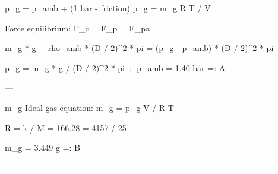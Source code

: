 p_g = p_amb + (1 bar - friction)  
p_g = m_g R T / V  

Force equilibrium:  
F_c = F_p = F_pa  

m_g * g + rho_amb * (D / 2)^2 * pi = (p_g - p_amb) * (D / 2)^2 * pi  

p_g = m_g * g / (D / 2)^2 * pi + p_amb = 1.40 bar =: A  

---

m_g  
Ideal gas equation:  
m_g = p_g V / R T  

R = k / M = 166.28 = 4157 / 25  

m_g = 3.449 g =: B  

---